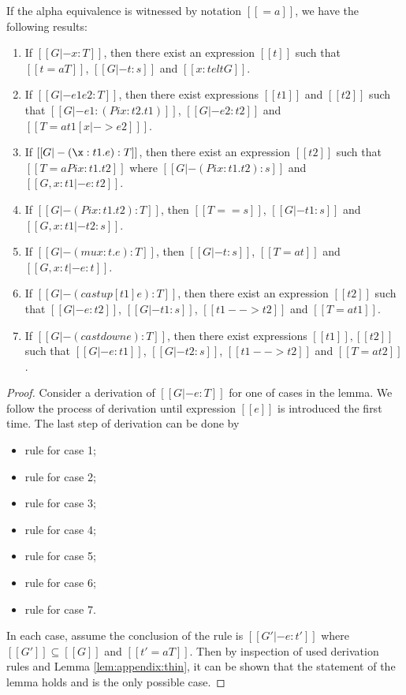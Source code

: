 \begin{lem}[Generation]\label{lem:appendix:gen}
If the alpha equivalence is witnessed by notation $[[=a]]$, we have the following results:
\begin{enumerate}[(1)]
	\item If $[[G |- x:T]]$, then there exist an expression $[[t]]$ such that $[[t
=a T]]$, $[[G |- t:s]]$ and $[[x:t elt G]]$.
	\item If $[[G |- e1 e2:T]]$, then there exist expressions $[[t1]]$ and
$[[t2]]$ such that $[[G |- e1 : (Pi x:t2.t1)]]$, $[[G |- e2:t2]]$ and $[[T =a
t1[x |-> e2] ]]$.
	\item If $[[G |- (\x:t1.e):T]]$, then there exist an expression $[[t2]]$ such
that $[[T =a Pi x:t1.t2]]$ where $[[G |- (Pi x:t1.t2):s]]$ and $[[G,x:t1 |-
e:t2]]$.
    \item If $[[G |- (Pi x:t1.t2):T]]$, then $[[T == s]]$, $[[G |- t1:s]]$ and
$[[G, x:t1 |- t2:s]]$.
	\item If $[[G |- (mu x:t.e):T]]$, then $[[G |- t:s]]$, $[[T =a t]]$ and $[[G,
x:t|-e:t]]$.
	\item If $[[G |- (castup [t1] e):T]]$, then there exist an expression $[[t2]]$
such that $[[G |- e:t2]]$, $[[G |- t1:s]]$, $[[t1 --> t2]]$ and $[[T =a t1]]$.
	\item If $[[G |- (castdown e):T]]$, then there exist expressions
$[[t1]],[[t2]]$ such that $[[G |- e:t1]]$, $[[G |- t2:s]]$, $[[t1 --> t2]]$ and
$[[T =a t2]]$.
\end{enumerate}
\end{lem}

\begin{proof}
    Consider a derivation of $[[G |- e:T]]$ for one of cases in the lemma. We
follow the process of derivation until expression $[[e]]$ is introduced the
first time. The last step of derivation can be done by
    \begin{itemize}
        \item rule  for case 1;
        \item rule  for case 2;
        \item rule  for case 3;
        \item rule  for case 4;
        \item rule  for case 5;
        \item rule  for case 6;
        \item rule  for case 7.
    \end{itemize}
    In each case, assume the conclusion of the rule is $[[G' |- e : t']]$ where
$[[G']] \subseteq [[G]]$ and $[[t' =a T]]$. Then by inspection of used
derivation rules and Lemma \ref{lem:appendix:thin}, it can be shown that the
statement of the lemma holds and is the only possible case.
\end{proof}

